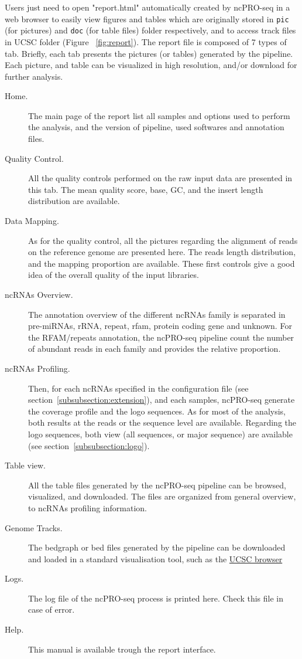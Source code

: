 \documentclass[12pt]{article}
\def \ncpip{ncPRO-seq}
\begin{document}
Users just need to open "report.html" automatically created by \ncpip{} in a web browser to easily view figures and tables which are originally stored in \verb+pic+ (for pictures) and \verb+doc+ (for table files) folder respectively, and to access track files in UCSC folder (Figure ~\ref{fig:report}). The report file is composed of 7 types of tab. Briefly, each tab presents the pictures (or tables) generated by the pipeline. Each picture, and table can be visualized in high resolution, and/or download for further analysis. 
\begin{description}
 \item[Home.] The main page of the report list all samples and options used to perform the analysis, and the version of pipeline, used softwares and annotation files.
 \item[Quality Control.] All the quality controls performed on the raw input data are presented in this tab. The mean quality score, base, GC, and the insert length distribution are available.
 \item[Data Mapping.] As for the quality control, all the pictures regarding the alignment of reads on the reference genome are presented here. The reads length distribution, and the mapping proportion are available. These first controls give a good idea of the overall quality of the input libraries.
 \item[ncRNAs Overview.] The annotation overview of the different ncRNAs family is separated in pre-miRNAs, rRNA, repeat, rfam, protein coding gene and unknown. For the RFAM/repeats annotation, the \ncpip{} pipeline count the number of abundant reads in each family and provides the relative proportion.
 \item[ncRNAs Profiling.] Then, for each ncRNAs specified in the configuration file (see section~\ref{subsubsection:extension}), and each samples, \ncpip{} generate the coverage profile and the logo sequences. As for most of the analysis, both results at the reads or the sequence level are available. Regarding the logo sequences, both view (all sequences, or major sequence) are available (see section~\ref{subsubsection:logo}).
 \item[Table view.] All the table files generated by the \ncpip{} pipeline can be browsed, visualized, and downloaded. The files are organized from general overview, to ncRNAs profiling information.
 \item[Genome Tracks.] The bedgraph or bed files generated by the pipeline can be downloaded and loaded in a standard visualisation tool, such as the \href{http://genome.ucsc.edu/index.html}{ UCSC browser} \cite{Dreszer2012}
 \item[Logs.] The log file of the \ncpip{} process is printed here. Check this file in case of error.
 \item[Help.] This manual is available trough the report interface.
 \end{description}
\end{document}
